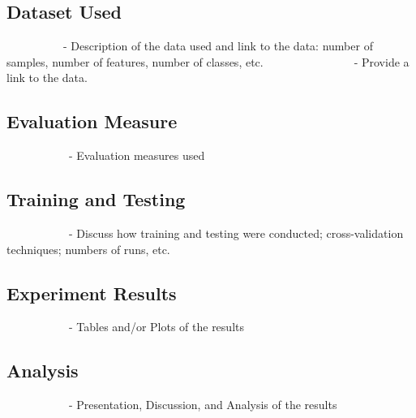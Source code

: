 \documentclass[12pt]{extarticle}
\begin{document}
\subsection{Dataset Used}
            - Description of the data used and link to the data: number of samples, number of features, number of classes, etc.                   - Provide a link to the data.

\subsection{Evaluation Measure}
             - Evaluation measures used

\subsection{Training and Testing}
             - Discuss how training and testing were conducted; cross-validation techniques; numbers of runs, etc.

\subsection{Experiment Results}
             - Tables and/or Plots of the results

\subsection{Analysis}
             - Presentation, Discussion, and Analysis of the results




\end{document}
